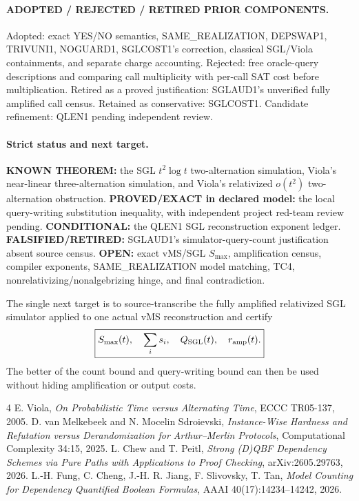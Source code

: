 \documentclass[11pt]{article}
\begin{document}
\paragraph{ADOPTED / REJECTED / RETIRED PRIOR COMPONENTS.}
Adopted: exact YES/NO semantics, SAME\_REALIZATION, DEPSWAP1, TRIVUNI1, NOGUARD1, SGLCOST1's correction, classical SGL/Viola containments, and separate charge accounting. Rejected: free oracle-query descriptions and comparing call multiplicity with per-call SAT cost before multiplication. Retired as a proved justification: SGLAUD1's unverified fully amplified call census. Retained as conservative: SGLCOST1. Candidate refinement: QLEN1 pending independent review.

\paragraph{Strict status and next target.}
\textbf{KNOWN THEOREM:} the SGL \(t^2\log t\) two-alternation simulation, Viola's near-linear three-alternation simulation, and Viola's relativized \(o(t^2)\) two-alternation obstruction.
\textbf{PROVED/EXACT in declared model:} the local query-writing substitution inequality, with independent project red-team review pending.
\textbf{CONDITIONAL:} the QLEN1 SGL reconstruction exponent ledger.
\textbf{FALSIFIED/RETIRED:} SGLAUD1's simulator-query-count justification absent source census.
\textbf{OPEN:} exact vMS/SGL \(S_{\max}\), amplification census, compiler exponents, SAME\_REALIZATION model matching, TC4, nonrelativizing/nonalgebrizing hinge, and final contradiction.

The single next target is to source-transcribe the fully amplified relativized SGL simulator applied to one actual vMS reconstruction and certify
\[
\boxed{
S_{\max}(t),\quad
\sum_i s_i,\quad
Q_{\rm SGL}(t),\quad
r_{\rm amp}(t).
}
\]
The better of the count bound and query-writing bound can then be used without hiding amplification or output costs.

\begin{thebibliography}{4}
 E. Viola, \emph{On Probabilistic Time versus Alternating Time}, ECCC TR05-137, 2005.
 D. van Melkebeek and N. Mocelin Sdroievski, \emph{Instance-Wise Hardness and Refutation versus Derandomization for Arthur--Merlin Protocols}, Computational Complexity 34:15, 2025.
 L. Chew and T. Peitl, \emph{Strong (D)QBF Dependency Schemes via Pure Paths with Applications to Proof Checking}, arXiv:2605.29763, 2026.
 L.-H. Fung, C. Cheng, J.-H. R. Jiang, F. Slivovsky, T. Tan, \emph{Model Counting for Dependency Quantified Boolean Formulas}, AAAI 40(17):14234--14242, 2026.
\end{thebibliography}
\end{document}
